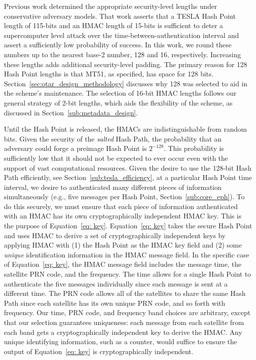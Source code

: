 \documentclass[letterpaper,times]{IONconf/IONconf}
\begin{document}
		Previous work determined the appropriate security-level lengths under conservative adversary models\cite{Neish_Dissertation}.
		That work asserts that a TESLA Hash Point length of 115-bits and an HMAC length of 15-bits is sufficient to deter a supercomputer level attack over the time-between-authentication interval and assert a sufficiently low probability of success.
		In this work, we round these numbers up to the nearest base-2 number, 128 and 16, respectively.
		Increasing these lengths adds additional security-level padding.
		The primary reason for 128 Hash Point lengths is that MT51, as specified, has space for 128 bits.
		Section~\ref{sec:otar_design_methodology} discusses why 128 was selected to aid in the scheme's maintenance.
		The selection of 16-bit HMAC lengths follows our general strategy of 2-bit lengths, which aids the flexibility of the scheme, as discussed in Section~\ref{sub:metadata_design}.

		Until the Hash Point is released, the HMACs are indistinguishable from random bits.
		Given the security of the {\em salted} Hash Path, the probability that an adversary could forge a preimage Hash Point is $2^{-128}$.
		This probability is sufficiently low that it should not be expected to ever occur even with the support of vast computational resources.
		Given the desire to use the 128-bit Hash Path efficiently, see Section~\ref{sub:tesla_efficiency}, at a particular Hash Point time interval, we desire to authenticated many different pieces of information simultaneously (e.g., five messages per Hash Point, Section~\ref{sub:core_eph}).
		To do this securely, we must ensure that each piece of information authenticated with an HMAC has its own cryptographically independent HMAC key.
		This is the purpose of Equation~\eqref{eq: key}.
		Equation~\eqref{eq: key} takes the secure Hash Point and uses HMAC to derive a set of cryptographically independent keys by applying HMAC with (1) the Hash Point as the HMAC key field and (2) some {\em unique} identification information in the HMAC message field.
		In the specific case of Equation~\eqref{eq: key}, the HMAC message field includes the message time, the satellite PRN code, and the frequency.
		The time allows for a single Hash Point to authenticate the five messages individually since each message is sent at a different time.
		The PRN code allows all of the satellites to share the same Hash Path since each satellite has its own unique PRN code, and so forth with frequency.
		Our time, PRN code, and frequency band choices are arbitrary, except that our selection guarantees uniqueness: each message from each satellite from each band gets a cryptographically independent key to derive the HMAC.
		Any unique identifying information, such as a counter, would suffice to ensure the output of Equation~\eqref{eq: key} is cryptographically independent.
\end{document}
